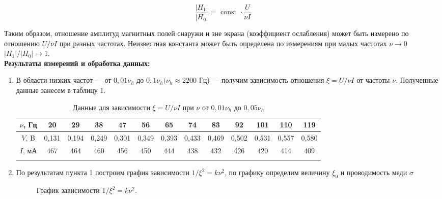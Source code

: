 \documentclass[a4paper, 12pt]{article}%
\begin{document}
	$$
	\frac{\left|H_1\right|}{\left|H_0\right|}=\text { const } \cdot \frac{U}{\nu I}
	$$
	
	Таким образом, отношение амплитуд магнитных полей снаружи и зне экрана (коэффициент ослабления) может быть измерено по отношению $U / \nu I$ при разных частотах. Неизвестная константа может быть определена по измерениям при малых частотах $\nu \rightarrow 0$ $\left|H_1\right| /\left|H_0\right| \rightarrow 1$.\\
	
	
	\textbf{Результаты измерений и обработка данных: }\\
	\begin{enumerate}
		
	\item В области низких частот — от $ 0,01\nu_h \text{ до }  0,1\nu_h (\nu_h \approx 2200$ Гц)  — получим зависимость отношения $\xi = U/\nu I $ от частоты $\nu$.
	Полученные данные занесем в таблицу 1.
	
	\begin{longtable} {|c|c|c|c|c|c|c|c|c|c|c|c|c|}
		\hline
		$\nu$, Гц& 20 & 29 & 38 & 47 & 56 & 65 & 74 & 83 & 92 & 101 & 110 & 119  \\ \hline
		
		$V$, B & 0,131 & 0,194 & 0,249 & 0,301 & 0,349 & 0,393 & 0,433 & 0,469 & 0,502 & 0,531 & 0,557 & 0,580 \\ \hline
		
		$I$, мА& 467 & 464 & 460 & 456 & 450 & 444 & 438 & 432 & 426 & 420 & 414 & 409 \\ \hline
		\caption{Данные для зависимости $\xi = U/\nu I $ при $\nu \text{ от } 0,01\nu_h \text{ до }  0,05\nu_h$}
	\end{longtable}
	
	\item По результатам пункта 1 построим график зависимости $1/\xi^2 = k \nu^2$, по графику определим величину $\xi_0$ и проводимость меди $\sigma$
	
	\begin{figure}[H]
		\caption{График зависимости $1/\xi^2 = k \nu^2$.}
	\end{figure}


\end{enumerate}
\end{document}
